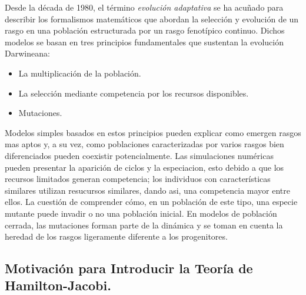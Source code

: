 \documentclass{article}
\begin{document}
{{            \normalsize{\citep{Mirrahimi} Desde la década de 1980, el término \textit{evolución adaptativa} se ha acuñado para describir los formalismos matemáticos que abordan la selección y evolución de un rasgo en una población estructurada por un rasgo fenotípico continuo. Dichos modelos se basan en tres principios fundamentales que sustentan la evolución Darwineana:}
            
                \begin{itemize}
                    \item {
                    
                        \normalsize{La multiplicación de la población.}

                    }
                    
                    \item {
                    
                        \normalsize{La selección mediante competencia por los recursos disponibles.}
                    }
                    
                    \item {
                    
                        \normalsize{Mutaciones.}

                    }
                \end{itemize}
                
            \normalsize{Modelos simples basados en estos principios pueden explicar como emergen rasgos mas aptos y, a su vez, como poblaciones caracterizadas por varios rasgos bien diferenciados pueden coexistir potencialmente. Las simulaciones numéricas pueden presentar la aparición de ciclos y la especiacion, esto debido a que los recursos limitados generan competencia; los individuos con características similares utilizan resucursos similares, dando asi, una competencia mayor entre ellos. La cuestión de comprender cómo, en un población de este tipo, una especie mutante puede invadir o no una población inicial. En modelos de población cerrada, las mutaciones forman parte de la dinámica y se toman en cuenta la heredad de los rasgos ligeramente diferente a los progenitores.}
        }
        
        \subsection{Motivación para Introducir la Teoría de Hamilton-Jacobi.}

}
\end{document}
